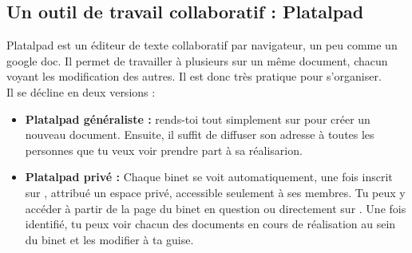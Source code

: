 \subsection{Un outil de travail collaboratif : Platalpad}
\label{platalpad}

Platalpad est un éditeur de texte collaboratif par navigateur, un peu comme un google doc. Il permet de travailler à plusieurs sur un même document, chacun voyant les modification des autres. Il est donc très pratique pour s'organiser.\\
Il se décline en deux versions :
\begin{itemize}

\item \textbf{Platalpad généraliste :} rends-toi tout simplement sur  pour créer un nouveau document. Ensuite, il suffit de diffuser son adresse à toutes les personnes que tu veux voir prendre part à sa réalisarion. \\

\item \textbf{Platalpad privé :} Chaque binet se voit automatiquement, une fois inscrit sur \fkz, attribué un espace privé, accessible seulement à ses membres. Tu peux y accéder à partir de la page \fkz du binet en question ou directement sur . Une fois identifié, tu peux voir chacun des documents en cours de réalisation au sein du binet et les modifier à ta guise.

\end{itemize}



